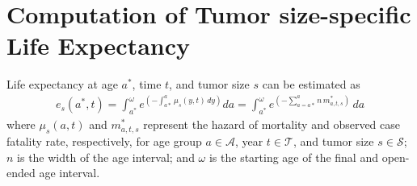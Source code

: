 \documentclass[11pt,letterpaper]{article}
\theoremstyle{plain}
\theoremstyle{remark}
\numberwithin{equation}{section}
\begin{document}
\section{Computation of Tumor size-specific Life Expectancy}
Life expectancy at age $a^*$, time $t$, and tumor size $s$ can be estimated as 
\begin{eqnarray}
 e_s(a^*,t)=\int_{a^*}^{\omega} e^{\left( -\int_{a*}^{a}\mu_s(y,t)\,dy \right)}da =\int_{a^*}^{\omega} e^{\left(-\sum_{a=a*}^{a}n\,m^*_{a,t,s}\right)}\,da 
\end{eqnarray} 
where $\mu_s(a,t)$ and $m^*_{a,t,s}$ represent the hazard of mortality
and observed case fatality rate, respectively, for age group $a \in
\mathcal{A}$, year $t \in \mathcal{T}$, and tumor size $s \in
\mathcal{S}$; $n$ is the width of the age interval; and $\omega$ is
the starting age of the final and open-ended age interval.
\end{document}
